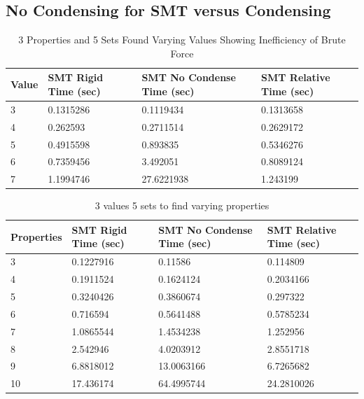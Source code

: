 \documentclass[pageno]{jpaper}
\begin{document}
\subsection{No Condensing for SMT versus Condensing}

\begin{table}[htbp]
  \centering
  \begin{tabular}{|l   |l   |l |l | } \hline
    \textbf{Value} & \textbf{SMT Rigid Time (sec)}  & \textbf{SMT No Condense Time (sec)} & \textbf{SMT Relative Time (sec)} \\\hline
3 & 0.1315286 &  0.1119434 &  0.1313658 \\ \hline
4 & 0.262593 &  0.2711514 &  0.2629172 \\ \hline
5 & 0.4915598 &  0.893835 &  0.5346276 \\ \hline
6 & 0.7359456 &  3.492051 &  0.8089124 \\ \hline
7 & 1.1994746 &  27.6221938 &  1.243199 \\ \hline
  \end{tabular}
  \caption{3 Properties and 5 Sets Found Varying Values Showing Inefficiency of Brute Force}
  \label{table:CondenseValTable}
\end{table}


\begin{table}[htbp]
  \centering
  \begin{tabular}{|l   |l   |l |l | } \hline
    \textbf{Properties} & \textbf{SMT Rigid Time (sec)}  & \textbf{SMT No Condense Time (sec)} & \textbf{SMT Relative Time (sec)} \\\hline
3 & 0.1227916 & 0.11586 & 0.114809 \\ \hline
4 & 0.1911524 & 0.1624124 & 0.2034166 \\ \hline
5 & 0.3240426 & 0.3860674 & 0.297322 \\ \hline
6 & 0.716594 & 0.5641488 & 0.5785234 \\ \hline
7 & 1.0865544 & 1.4534238 & 1.252956 \\ \hline
8 & 2.542946 & 4.0203912 & 2.8551718 \\ \hline
9 & 6.8818012 & 13.0063166 & 6.7265682 \\ \hline
10 & 17.436174 & 64.4995744 & 24.2810026 \\ \hline
  \end{tabular}
  \caption{3 values 5 sets to find varying properties}
  \label{table:CondensePropTable}
\end{table}
\end{document}
